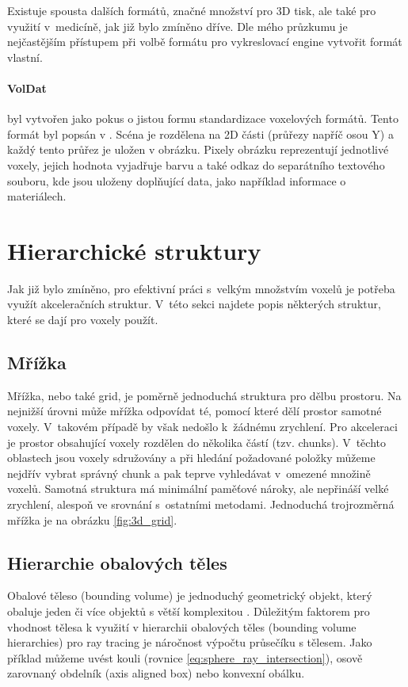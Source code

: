 Existuje spousta dalších formátů, značné množství pro 3D tisk, ale také pro využití v~medicíně, jak již bylo zmíněno dříve. Dle mého průzkumu je nejčastějším přístupem při volbě formátu pro vykreslovací engine vytvořit formát vlastní.

\paragraph{VolDat} byl vytvořen jako pokus o jistou formu standardizace voxelových formátů. Tento formát byl popsán v \cite{williams_2013}. Scéna je rozdělena na 2D části (průřezy napříč osou Y) a každý tento průřez je uložen v obrázku. Pixely obrázku reprezentují jednotlivé voxely, jejich hodnota vyjadřuje barvu a také odkaz do separátního textového souboru, kde jsou uloženy doplňující data, jako například informace o materiálech. 


\section{Hierarchické struktury}
Jak již bylo zmíněno, pro efektivní práci s~velkým množstvím voxelů je potřeba využít akceleračních struktur. V~této sekci najdete popis některých struktur, které se dají pro voxely použít.

\subsection{Mřížka}
Mřížka, nebo také grid, je poměrně jednoduchá struktura pro dělbu prostoru. Na nejnižší úrovni může mřížka odpovídat té, pomocí které dělí prostor samotné voxely. V~takovém případě by však nedošlo k~žádnému zrychlení. Pro akceleraci je prostor obsahující voxely rozdělen do několika částí (tzv. chunks). V~těchto oblastech jsou voxely sdružovány a při hledání požadované položky můžeme nejdřív vybrat správný chunk a pak teprve vyhledávat v~omezené množině voxelů. Samotná struktura má minimální paměťové nároky, ale nepřináší velké zrychlení, alespoň ve srovnání s~ostatními metodami. Jednoduchá trojrozměrná mřížka je na obrázku \ref{fig:3d_grid}.

\subsection{Hierarchie obalových těles} \label{sec:BVH}
Obalové těleso (bounding volume) je jednoduchý geometrický objekt, který obaluje jeden či více objektů s větší komplexitou \cite{ericson_2005}. Důležitým faktorem pro vhodnost tělesa k využití v hierarchii obalových těles (bounding volume hierarchies) pro ray tracing je náročnost výpočtu průsečíku s tělesem. Jako příklad můžeme uvést kouli (rovnice \ref{eq:sphere_ray_intersection}), osově zarovnaný obdelník (axis aligned box) nebo konvexní obálku. 

